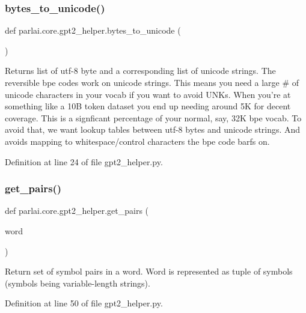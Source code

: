 \subsubsection{\texorpdfstring{bytes\+\_\+to\+\_\+unicode()}{bytes\_to\_unicode()}}
{\footnotesize\ttfamily def parlai.\+core.\+gpt2\+\_\+helper.\+bytes\+\_\+to\+\_\+unicode (\begin{DoxyParamCaption}{ }\end{DoxyParamCaption})}

\begin{DoxyVerb}Returns list of utf-8 byte and a corresponding list of unicode strings.
The reversible bpe codes work on unicode strings.
This means you need a large # of unicode characters in your vocab if you want to avoid UNKs.
When you're at something like a 10B token dataset you end up needing around 5K for decent coverage.
This is a signficant percentage of your normal, say, 32K bpe vocab.
To avoid that, we want lookup tables between utf-8 bytes and unicode strings.
And avoids mapping to whitespace/control characters the bpe code barfs on.
\end{DoxyVerb}
 

Definition at line 24 of file gpt2\+\_\+helper.\+py.

\mbox{\label{namespaceparlai_1_1core_1_1gpt2__helper_ac5bffa2aece99e43444185ba85dff425}} 
\subsubsection{\texorpdfstring{get\+\_\+pairs()}{get\_pairs()}}
{\footnotesize\ttfamily def parlai.\+core.\+gpt2\+\_\+helper.\+get\+\_\+pairs (\begin{DoxyParamCaption}\item[{}]{word }\end{DoxyParamCaption})}

\begin{DoxyVerb}Return set of symbol pairs in a word.
Word is represented as tuple of symbols (symbols being variable-length strings).
\end{DoxyVerb}
 

Definition at line 50 of file gpt2\+\_\+helper.\+py.



